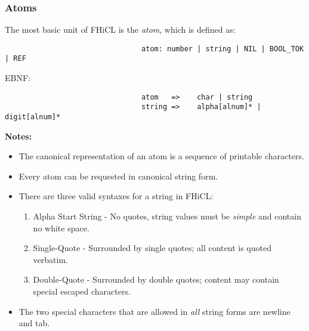 \documentclass{article}
\begin{document}
                \subsubsection{Atoms}
                        The most basic unit of FHiCL is the \emph{atom},
                        which is defined as: 
                        \begin{verbatim}
                                atom: number | string | NIL | BOOL_TOK | REF
                        \end{verbatim}
                        \vspace{1mm}
                        EBNF:
                        \begin{verbatim}
                                atom   =>    char | string
                                string =>    alpha[alnum]* | digit[alnum]*
                        \end{verbatim}
                        \vspace{1mm}
                        \par
                        \bf Notes: \rm
                        \begin{itemize}
                                \item The canonical representation of an atom is a sequence of printable characters.
                                \item Every atom can be requested in canonical string form.
                                \item There are three valid syntaxes for a string in FHiCL:
                                \begin{enumerate}
                                        \item Alpha Start String - No quotes, string values must be \emph{simple}
                                                and contain no white space.
                                        \item Single-Quote - Surrounded by single quotes;
                                                all content is quoted verbatim.
                                        \item Double-Quote - Surrounded by double quotes;
                                                content may contain special escaped characters.
                                \end{enumerate}
                                \item The two special characters that are allowed in \emph{all} string forms are newline and tab.
                        \end{itemize}
                        
\end{document}
